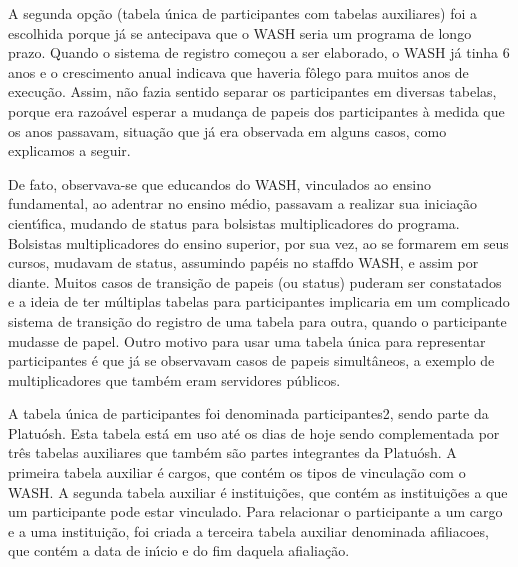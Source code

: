 \documentclass[
12pt,		%
openright,	%
twoside,  %
a4paper,			%
chapter=TITLE,		%
english,			%
french,				%
spanish,			%
brazil				%
]{USPSC-classe/USPSC}
\begin{document}
A segunda op\c{c}\~ao (tabela \'unica de participantes com tabelas auxiliares) foi a escolhida porque j\'a se antecipava que o WASH seria um programa de longo prazo. Quando o sistema de registro come\c{c}ou a ser elaborado, o WASH j\'a tinha 6 anos e o crescimento anual indicava que haveria f\^olego para muitos anos de execu\c{c}\~ao. Assim, n\~ao fazia sentido separar os participantes em diversas tabelas, porque era razo\'avel esperar a mudan\c{c}a de papeis dos participantes \`a medida que os anos passavam, situa\c{c}\~ao que j\'a era observada em alguns casos, como explicamos a seguir.








De fato, observava-se que educandos do WASH, vinculados ao ensino fundamental, ao adentrar no ensino m\'edio, passavam a realizar sua inicia\c{c}\~ao cient\'{\i}fica, mudando de status para bolsistas multiplicadores do programa. Bolsistas multiplicadores do ensino superior, por sua vez, ao se formarem em seus cursos, mudavam de status, assumindo pap\'eis no  \textquotedbl staff\textquotedbl  do WASH, e assim por diante. Muitos casos de transi\c{c}\~ao de papeis (ou \textquotedbl status\textquotedbl ) puderam ser constatados e a ideia de ter m\'ultiplas tabelas para participantes implicaria em um complicado sistema de transi\c{c}\~ao do registro de uma tabela para outra, quando o participante mudasse de papel. Outro motivo para usar uma tabela \'unica para representar participantes \'e que j\'a se observavam casos de papeis simult\^aneos, a exemplo de multiplicadores que tamb\'em eram servidores p\'ublicos.








A tabela \'unica de participantes foi denominada \textquotedbl participantes2\textquotedbl , sendo parte da  \textquotedbl Platu\'osh\textquotedbl . Esta tabela est\'a em uso at\'e os dias de hoje sendo complementada por tr\^es tabelas auxiliares que tamb\'em s\~ao partes integrantes da \textquotedbl Platu\'osh\textquotedbl . A primeira tabela auxiliar \'e \textquotedbl cargos\textquotedbl , que cont\'em os tipos de vincula\c{c}\~ao com o WASH. A segunda tabela auxiliar \'e \textquotedbl institui\c{c}\~oes\textquotedbl , que cont\'em as institui\c{c}\~oes a que um participante pode estar vinculado. Para relacionar o participante a um cargo e a uma institui\c{c}\~ao, foi criada a terceira tabela auxiliar denominada \textquotedbl afiliacoes\textquotedbl , que cont\'em a data de in\'{\i}cio e do fim daquela afialia\c{c}\~ao.
\end{document}
